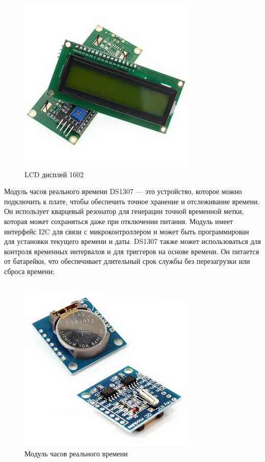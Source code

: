 \begin{figure}[H]
    \centering
    \includegraphics{images/lcd.jpg}
    \caption{LCD дисплей 1602}
    \label{fig:lcd}
\end{figure}


Модуль часов реального времени DS1307 --- это устройство, которое можно подключить к плате, чтобы обеспечить точное хранение и отслеживание времени. Он использует кварцевый резонатор для генерации точной временной метки, которая может сохраняться даже при отключении питания. Модуль имеет интерфейс I2C для связи с микроконтроллером и может быть программирован для установки текущего времени и даты. DS1307 также может использоваться для контроля временных интервалов и для триггеров на основе времени. Он питается от батарейки, что обеспечивает длительный срок службы без перезагрузки или сброса времени;

\begin{figure}[H]
    \centering
    \includegraphics[scale=0.6]{images/ds1307.jpg}
    \caption{Модуль часов реального времени}
    \label{fig:ds1307}
\end{figure}

